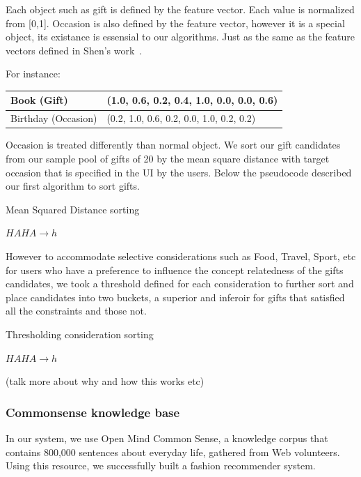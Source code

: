 \documentclass[11pt,twocolumn]{article}
\begin{document}
Each object such as gift is defined by the feature vector. Each value is normalized from [0,1].
Occasion is also defined by the feature vector, however it is a special object, its existance
is essensial to our algorithms. Just as the same as the feature vectors defined in Shen's work~\cite{Shen}.

\noindent For instance: 


\noindent \begin{tabular}{| l | l |}
\hline
Book (Gift) & (1.0, 0.6, 0.2, 0.4, 1.0, 0.0, 0.0, 0.6) \\
\hline
Birthday (Occasion) & (0.2, 1.0, 0.6, 0.2, 0.0, 1.0, 0.2, 0.2) \\
\hline
\end{tabular}




Occasion is treated differently than normal object. We sort our gift candidates from our sample pool of gifts of 20 by the mean square distance with target occasion that is specified in the UI by the users. Below the pseudocode described our first algorithm to sort gifts.

\begin{algorithm}
\caption{Mean Squared Distance sorting}
\label{mse}
\begin{algorithmic}
\STATE $HAHA \rightarrow h$
\end{algorithmic}
\end{algorithm}


However to accommodate selective considerations such as Food, Travel, Sport, etc for users who have a preference to influence the concept relatedness of the gifts candidates, we took a threshold defined for each consideration to further sort and place candidates into two buckets, a superior and inferoir for gifts that satisfied all the constraints and those not.

\begin{algorithm}
\caption{Thresholding consideration sorting}
\label{tcs}
\begin{algorithmic}
\STATE $HAHA \rightarrow h$
\end{algorithmic}
\end{algorithm}

(talk more about why and how this works etc)


\subsubsection{Commonsense knowledge base}
In our system, we use Open Mind Common Sense, a knowledge corpus that contains 800,000 sentences about everyday life, gathered from Web volunteers. Using this resource, we successfully built a fashion recommender system.
\end{document}
